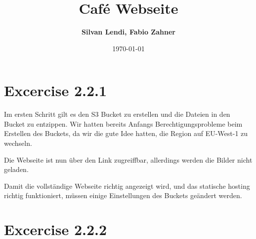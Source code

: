 \documentclass{article}
\title{\textbf{Café Webseite}}
\date{\mydate\today}
\begin{document}
\maketitle
\begin{center}

\author{\textbf{Silvan Lendi, Fabio Zahner}}
\end{center}

\newpage
\tableofcontents
\newpage

\section{Excercise 2.2.1}


Im ersten Schritt gilt es den S3 Bucket zu erstellen und die Dateien in den Bucket zu entzippen. Wir hatten bereits Anfangs Berechtigungsprobleme beim Erstellen des Buckets, da wir die gute Idee hatten, die Region auf EU-West-1 zu wechseln.

Die Webseite ist nun über den Link zugreiffbar, allerdings werden die Bilder nicht geladen.

Damit die vollständige Webseite richtig angezeigt wird, und das statische hosting richtig funktioniert, müssen einige Einstellungen des Buckets geändert werden.


\section{Excercise 2.2.2}
\end{document}
